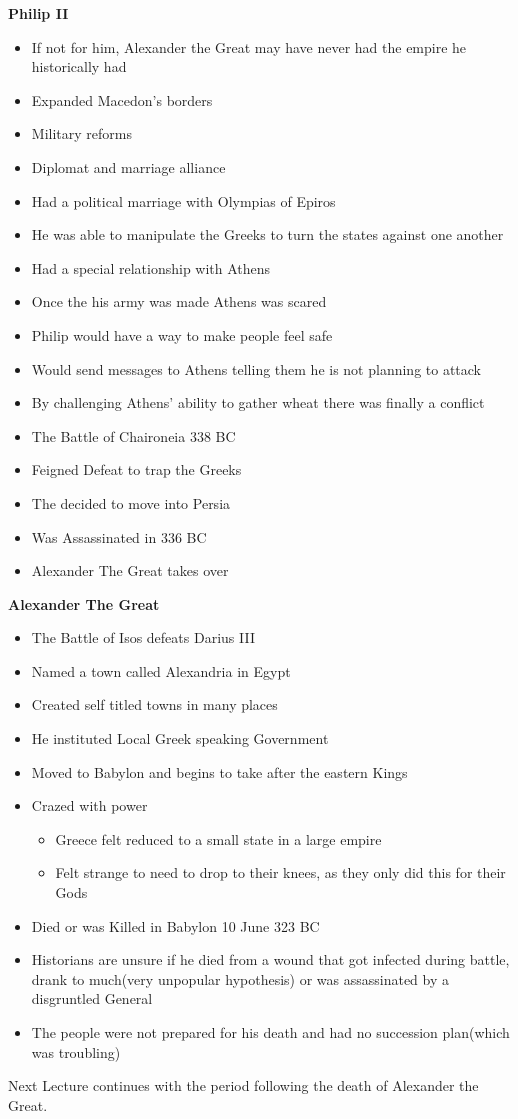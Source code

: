 \documentclass[12pt,a4paper]{report}
\begin{document}
	\textbf{Philip II}
	\begin{itemize}
	\item If not for him, Alexander the Great may have never had the empire he historically had
	\item Expanded Macedon's borders
	\item Military reforms
	\item Diplomat and marriage alliance
	\item Had a political marriage with Olympias of Epiros
	\item He was able to manipulate the Greeks to turn the states against one another
	\item Had a special relationship with Athens
	\item Once the his army was made Athens was scared
	\item Philip would have a way to make people feel safe
	\item Would send messages to Athens telling them he is not planning to attack
	\item By challenging Athens' ability to gather wheat there was finally a conflict
	\item The Battle of Chaironeia 338 BC
	\item Feigned Defeat to trap the Greeks
	\item The decided to move into Persia
	\item Was Assassinated in 336 BC
	\item Alexander The Great takes over
	\end{itemize}
	\textbf{Alexander The Great}
	\begin{itemize}
	\item The Battle of Isos defeats Darius III
	\item Named a town called Alexandria in Egypt
	\item Created self titled towns in many places
	\item He instituted Local Greek speaking Government
	\item Moved to Babylon and begins to take after the eastern Kings
	\item Crazed with power
	\begin{itemize}
	\item Greece felt reduced to a small state in a large empire
	\item Felt strange to need to drop to their knees, as they only did this for their Gods
	\end{itemize}
	\item Died or was Killed in Babylon 10 June 323 BC
	\item Historians are unsure if he died from a wound that got infected during battle, drank to much(very unpopular hypothesis) or was assassinated by a disgruntled General
	\item The people were not prepared for his death and had no succession plan(which was troubling)
	\end{itemize}
Next Lecture continues with the period following the death of Alexander the Great.
	
\end{document}
